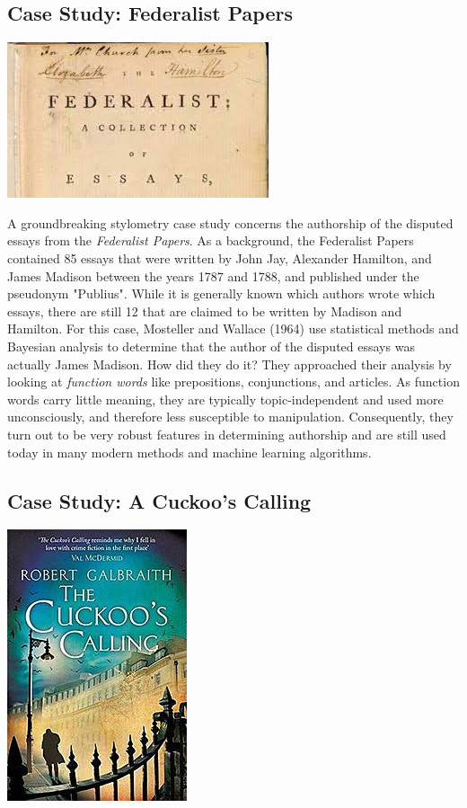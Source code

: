 \documentclass{article}
\begin{document}
\subsection{Case Study: Federalist Papers}
\begin{center}
\includegraphics[scale=0.6]{federalist}
\end{center}

 A groundbreaking stylometry case study concerns the authorship of the disputed essays from the \textit{Federalist Papers}.  As a background, the Federalist Papers contained 85 essays that were written by John Jay, Alexander Hamilton, and James Madison between the years 1787 and 1788, and published under the pseudonym "Publius". While it is generally known which authors wrote which essays, there are still 12 that are claimed to be written by Madison and Hamilton.
 For this case, Mosteller and Wallace (1964) use statistical methods and Bayesian analysis to determine that the author of the disputed essays was actually James Madison. How did they do it? They approached their analysis by looking at \textit{function words} like prepositions, conjunctions, and articles. As function words carry little meaning, they are typically topic-independent and used more unconsciously, and therefore less susceptible to manipulation. Consequently, they turn out to be very robust features in determining authorship and are still used today in many modern methods and machine learning algorithms. 


\subsection{Case Study: A Cuckoo's Calling}
\begin{center}
    \includegraphics[scale=0.6]{cuckoo}
\end{center}
\end{document}
